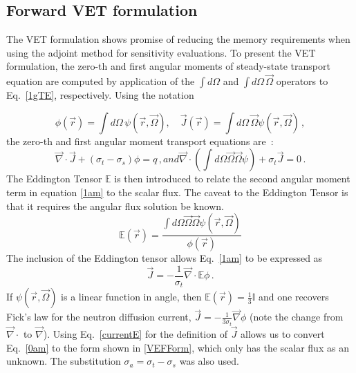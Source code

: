 \documentclass[12pt]{report}
\newcommand{\vr}{\vec{r}}
\newcommand{\vO}{\vec{\Omega}}
\renewcommand{\div}{\vec{\nabla} \cdot}
\newcommand{\grad}{\vec{\nabla}}
\newcommand{\Edd}{\mathbb{E}}
\newcommand{\sigt}{\sigma_t}
\newcommand{\sigs}{\sigma_s}
\newcommand{\siga}{\sigma_a}
\newcommand{\scalSource}{q}
\begin{document}
\subsection{Forward VET formulation}

The VET formulation shows promise of reducing the memory requirements when using the adjoint method for sensitivity evaluations. To present the VET formulation, the zero-th and first angular moments of steady-state transport equation are computed by application of the $\int d \Omega$ and $\int d \Omega \, \vO$ operators to Eq.~\eqref{1gTE}, respectively. Using the notation

\begin{equation}
\label{VETFormStart}
\phi(\vr)=\int d\Omega \, \psi( \vr,\vO )
,\quad
\vec{J}(\vr)= \int d\Omega \, \vO \psi( \vr,\vO ) \,,
\end{equation}
the zero-th and first angular moment transport equations are~: 
%
\begin{subequations}
%
\begin{equation}
\label{0am}
\div \vec{J} + (\sigt-\sigs) \phi = \scalSource \,,
\end{equation}
and
\begin{equation}
\label{1am}
\div \left(  \int d\Omega \vO \vO \psi \right) + \sigt \vec{J} = 0 \,.
\end{equation}
%
\end{subequations}
The Eddington Tensor $\Edd$ is then introduced to relate the second angular moment term in equation \eqref{1am} to the scalar flux. The caveat to the Eddington Tensor is that it requires the angular flux solution be known.
\begin{equation}
\label{EddDef}
\Edd(\vr)=\frac{\int d\Omega \vO \vO \psi(\vr,\vO)}{\phi(\vr)}
\end{equation}
The inclusion of the Eddington tensor allows Eq.~\eqref{1am} to be expressed as 
\begin{equation}
\label{currentE}
\vec{J} = - \frac{1}{\sigt} \div \Edd \phi \,.
\end{equation}
If $\psi(\vr,\vO)$ is a linear function in angle, then $\Edd(\vr)=\tfrac{1}{3}\mathbb{I}$ and one recovers Fick's law for the neutron diffusion current, $\vec{J} = - \frac{1}{3\sigt} \grad \phi$ (note the change from $\div$ to $\grad$). Using Eq.~\eqref{currentE} for the definition of $\vec{J}$ allows us to convert Eq.~\eqref{0am} to the form shown in \eqref{VEFForm}, which only has the scalar flux as an unknown. The substitution $\siga = \sigt-\sigs$ was also used.
\end{document}

